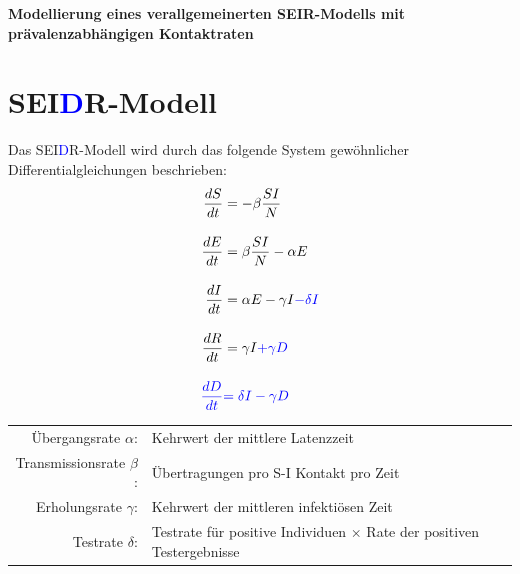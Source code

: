 \documentclass{scrartcl}
\begin{document}
\begin{center}
\huge\textbf{Modellierung eines verallgemeinerten SEIR-Modells mit prävalenzabhängigen Kontaktraten}
\end{center}

\section{SEI\textcolor{blue}{D}R-Modell}

Das SEI\textcolor{blue}{D}R-Modell wird durch das folgende System gewöhnlicher Differentialgleichungen beschrieben:
\begin{align*}
\frac{dS}{dt} &= -\beta \frac{SI}{N} \\[10pt]
\frac{dE}{dt} &= \beta \frac{SI}{N} - \alpha E \\[10pt]
\frac{dI}{dt} &= \alpha E - \gamma I \textcolor{blue}{- \delta I} \\[10pt] 
\frac{dR}{dt} &= \gamma I \textcolor{blue}{+ \gamma D} \\[10pt] 
\textcolor{blue}{\frac{dD}{dt}} &\textcolor{blue}{= \delta I - \gamma D}
\end{align*}

\begin{tabular}{rl}
	Übergangsrate $\alpha$:& Kehrwert der mittlere Latenzzeit \\
	Transmissionsrate $\beta$:& Übertragungen pro S-I Kontakt pro Zeit \\
	Erholungsrate $\gamma$:& Kehrwert der mittleren infektiösen Zeit\\
	Testrate $\delta$: &  Testrate für positive Individuen $\times$ Rate der positiven Testergebnisse
\end{tabular}

%
%
\end{document}
